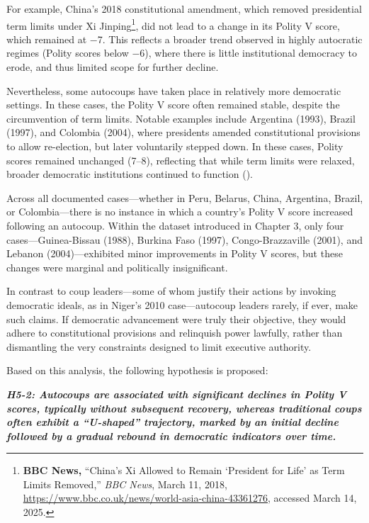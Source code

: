 \documentclass[
  12pt,
]{report}
\begin{document}
For example, China's 2018 constitutional amendment, which removed
presidential term limits under Xi Jinping\footnote{\textbf{BBC News,}
  ``China's Xi Allowed to Remain `President for Life' as Term Limits
  Removed,'' \emph{BBC News}, March 11, 2018,
  \url{https://www.bbc.co.uk/news/world-asia-china-43361276}, accessed
  March 14, 2025.}, did not lead to a change in its Polity V score,
which remained at −7. This reflects a broader trend observed in highly
autocratic regimes (Polity scores below −6), where there is little
institutional democracy to erode, and thus limited scope for further
decline.

Nevertheless, some autocoups have taken place in relatively more
democratic settings. In these cases, the Polity V score often remained
stable, despite the circumvention of term limits. Notable examples
include Argentina (1993), Brazil (1997), and Colombia (2004), where
presidents amended constitutional provisions to allow re-election, but
later voluntarily stepped down. In these cases, Polity scores remained
unchanged (7--8), reflecting that while term limits were relaxed,
broader democratic institutions continued to function
().

Across all documented cases---whether in Peru, Belarus, China,
Argentina, Brazil, or Colombia---there is no instance in which a
country's Polity V score increased following an autocoup. Within the
dataset introduced in Chapter 3, only four cases---Guinea-Bissau (1988),
Burkina Faso (1997), Congo-Brazzaville (2001), and Lebanon
(2004)---exhibited minor improvements in Polity V scores, but these
changes were marginal and politically insignificant.

In contrast to coup leaders---some of whom justify their actions by
invoking democratic ideals, as in Niger's 2010 case---autocoup leaders
rarely, if ever, make such claims. If democratic advancement were truly
their objective, they would adhere to constitutional provisions and
relinquish power lawfully, rather than dismantling the very constraints
designed to limit executive authority.

Based on this analysis, the following hypothesis is proposed:

\textbf{\emph{H5-2: Autocoups are associated with significant declines
in Polity V scores, typically without subsequent recovery, whereas
traditional coups often exhibit a ``U-shaped'' trajectory, marked by an
initial decline followed by a gradual rebound in democratic indicators
over time.}}
\end{document}
